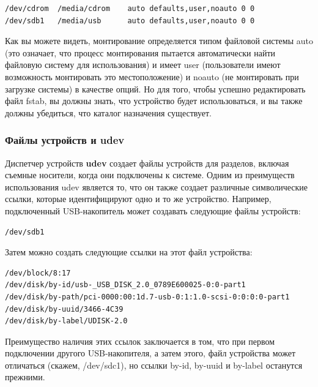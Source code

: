 \documentclass[10pt]{book}
\begin{document}
\begin{tcolorbox} 
\begin{lstlisting}
/dev/cdrom  /media/cdrom    auto defaults,user,noauto 0 0
/dev/sdb1   /media/usb      auto defaults,user,noauto 0 0
\end{lstlisting}
\end{tcolorbox}

Как вы можете видеть, монтирование определяется типом файловой системы auto (это означает, что процесс монтирования пытается автоматически найти файловую систему для использования) и имеет user (пользователи имеют возможность монтировать это местоположение) и noauto (не монтировать при загрузке системы) в качестве опций.
Но для того, чтобы успешно редактировать файл fstab, вы должны знать, что устройство будет использоваться, и вы также должны убедиться, что каталог назначения существует.

\subsubsection{Файлы устройств и udev}

Диспетчер устройств \textbf{udev} создает файлы устройств для разделов, включая съемные носители, когда они подключены к системе. Одним из преимуществ использования udev является то, что он также создает различные символические ссылки, которые идентифицируют одно и то же устройство. Например, подключенный USB-накопитель может создавать следующие файлы устройств:

\begin{tcolorbox} 
\begin{lstlisting}
/dev/sdb1
\end{lstlisting}
\end{tcolorbox}

Затем можно создать следующие ссылки на этот файл устройства:

\begin{tcolorbox} 
\begin{lstlisting}
/dev/block/8:17
/dev/disk/by-id/usb-_USB_DISK_2.0_0789E600025-0:0-part1
/dev/disk/by-path/pci-0000:00:1d.7-usb-0:1:1.0-scsi-0:0:0:0-part1
/dev/disk/by-uuid/3466-4C39
/dev/disk/by-label/UDISK-2.0
\end{lstlisting}
\end{tcolorbox}

Преимущество наличия этих ссылок заключается в том, что при первом подключении другого USB-накопителя, а затем этого, файл устройства может отличаться (скажем, /dev/sdc1), но ссылки by-id, by-uuid и by-label останутся прежними.
\end{document}
